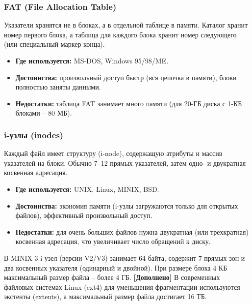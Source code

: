 \documentclass[a4paper,12pt]{article}
\begin{document}
\subsubsection{FAT (File Allocation Table)}
Указатели хранятся не в блоках, а в отдельной таблице в памяти. Каталог хранит номер первого блока, а таблица для каждого блока хранит номер следующего (или специальный маркер конца). 
\begin{itemize}
    \item \textbf{Где используется:} MS-DOS, Windows 95/98/ME.
    \item \textbf{Достоинства:} произвольный доступ быстр (вся цепочка в памяти), блоки полностью заняты данными.
    \item \textbf{Недостатки:} таблица FAT занимает много памяти (для 20-ГБ диска с 1-КБ блоками – 80 МБ).
\end{itemize}

\subsubsection{i-узлы (inodes)}
Каждый файл имеет структуру (i-node), содержащую атрибуты и массив указателей на блоки. Обычно 7–12 прямых указателей, затем одно- и двукратная косвенная адресация.
\begin{itemize}
    \item \textbf{Где используется:} UNIX, Linux, MINIX, BSD.
    \item \textbf{Достоинства:} экономия памяти (i-узлы загружаются только для открытых файлов), эффективный произвольный доступ.
    \item \textbf{Недостатки:} для очень больших файлов нужна двукратная (или трёхкратная) косвенная адресация, что увеличивает число обращений к диску.
\end{itemize}
В MINIX 3 i-узел (версии V2/V3) занимает 64 байта, содержит 7 прямых зон и два косвенных указателя (одинарный и двойной). При размере блока 4 КБ максимальный размер файла – более 4 ГБ. \textbf{[Дополнено]} В современных файловых системах Linux (ext4) для уменьшения фрагментации используются экстенты (extents), а максимальный размер файла достигает 16 ТБ.
\end{document}
